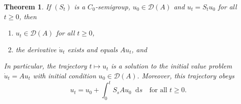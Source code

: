 \documentclass[12pt, reqno]{amsart}
\renewcommand{\geq}{\geqslant}
\newcommand{\1}{\mathbbm 1}
\newcommand*\diff{\mathop{}\!\mathrm{d}}
\newcommand{\dD}{\mathcal D}
\theoremstyle{plain}
\newtheorem{theorem}{Theorem}[section]
\theoremstyle{definition}
\begin{document}
\begin{theorem}\label{t:diffpath}
    If $(S_t)$ is a $C_0$-semigroup, $u_0 \in \dD(A)$ and $u_t = S_t u_0$
    for all $t \geq 0$, then
    \begin{enumerate}
        \item $u_t \in \dD(A)$  for all $t \geq 0$,
        \item the derivative $\dot u_t$ exists and equals $A u_t$, and
    \end{enumerate}
    In particular, the trajectory $t \mapsto u_t$ is a solution to the initial
    value problem $\dot u_t = A u_t$ with initial condition $u_0 \in \dD(A)$.  Moreover,
    this trajectory obeys
    \begin{equation}
        u_t = u_0 + \int_0^t S_s A u_0 \diff s
        \quad \text{for all } t \geq 0.
    \end{equation}
\end{theorem}
\end{document}
